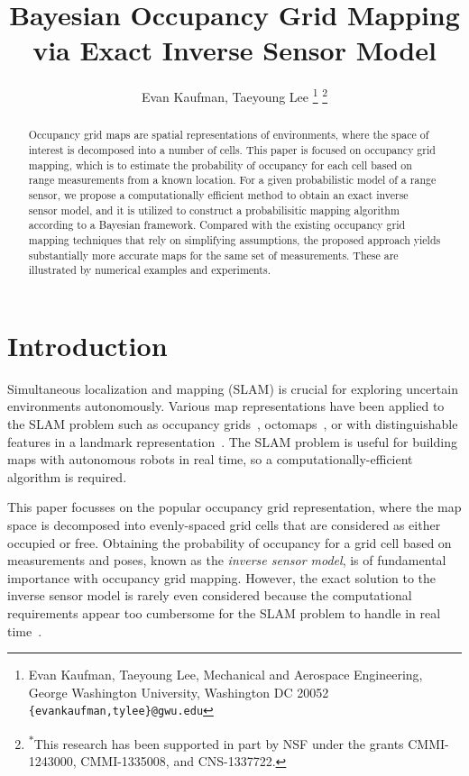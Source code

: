 \documentclass[letterpaper, 10pt, conference]{ieeeconf}
\title{\LARGE \bf
Bayesian Occupancy Grid Mapping via Exact Inverse Sensor Model}
\author{Evan Kaufman, Taeyoung Lee%
\thanks{Evan Kaufman, Taeyoung Lee, Mechanical and Aerospace Engineering, George Washington University, Washington DC 20052 {\tt \{evankaufman,tylee\}@gwu.edu}}
\thanks{\textsuperscript{\footnotesize\ensuremath{*}}This research has been supported in part by NSF under the grants CMMI-1243000, CMMI-1335008, and CNS-1337722.}
}
\begin{document}
\allowdisplaybreaks


\maketitle \thispagestyle{empty} \pagestyle{empty}

\begin{abstract}
Occupancy grid maps are spatial representations of environments, where the space of interest is decomposed into a number of cells. This paper is focused on occupancy grid mapping, which is to estimate the probability of occupancy for each cell based on range measurements from a known location. For a given probabilistic model of a range sensor, we propose a computationally efficient method to obtain an exact inverse sensor model, and it is utilized to construct a probabilisitic mapping algorithm according to a Bayesian framework. Compared with the existing occupancy grid mapping techniques that rely on simplifying assumptions, the proposed approach yields substantially more accurate maps for the same set of measurements. These are illustrated by numerical examples and experiments. 
\end{abstract}

\section{Introduction}

Simultaneous localization and mapping (SLAM) is crucial for exploring uncertain environments autonomously.
Various map representations have been applied to the SLAM problem such as occupancy grids~\cite{WolSuk05}, octomaps~\cite{WurHorBenStaBur10}, or with distinguishable features in a landmark representation~\cite{MonThrKolWeg02}.
The SLAM problem is useful for building maps with autonomous robots in real time, so a computationally-efficient algorithm is required.

This paper focusses on the popular occupancy grid representation, where the map space is decomposed into evenly-spaced grid cells that are considered as either occupied or free.
Obtaining the probability of occupancy for a grid cell based on measurements and poses, known as the \emph{inverse sensor model}, is of fundamental importance with occupancy grid mapping. However, the exact solution to the inverse sensor model is rarely even considered because the computational requirements appear too cumbersome for the SLAM problem to handle in real time~\cite{ThrBurFox05}.
\end{document}
